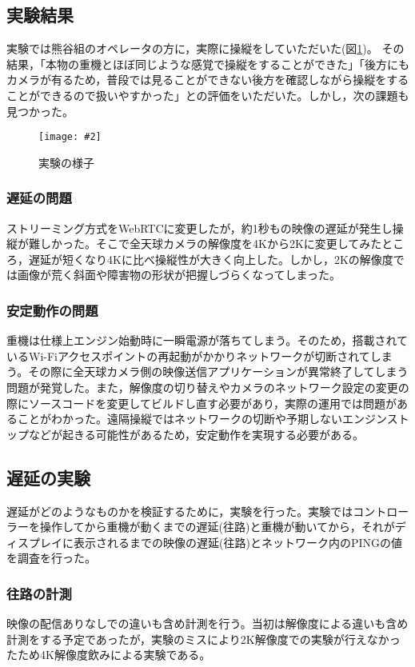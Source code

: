 \documentclass[a4paper,12pt]{jsarticle}
\newcommand{\figuref}[1]{図\ref{#1}}
\newcommand{\fig}[4][width=\textwidth]{
    \begin{figure}[!h]
    \begin{center}
    \texttt{[image: \#2]}
    \caption{#3}
    \label{#4}
    \vspace*{-1cm}
    \end{center}
    \end{figure}
}
\begin{document}
\subsection{実験結果}
実験では熊谷組のオペレータの方に，実際に操縦をしていただいた(\figuref{test})。 その結果，「本物の重機とほぼ同じような感覚で操縦をすることができた」「後方にもカメラが有るため，普段では見ることができない後方を確認しながら操縦をすることができるので扱いやすかった」との評価をいただいた。しかし，次の課題も見つかった。
\fig[width=7cm]{image/test.jpg}{実験の様子}{test}

\subsubsection{遅延の問題}
ストリーミング方式をWebRTCに変更したが，約1秒もの映像の遅延が発生し操縦が難しかった。そこで全天球カメラの解像度を4Kから2Kに変更してみたところ，遅延が短くなり4Kに比べ操縦性が大きく向上した。しかし，2Kの解像度では画像が荒く斜面や障害物の形状が把握しづらくなってしまった。

\subsubsection{安定動作の問題}
重機は仕様上エンジン始動時に一瞬電源が落ちてしまう。そのため，搭載されているWi-Fiアクセスポイントの再起動がかかりネットワークが切断されてしまう。その際に全天球カメラ側の映像送信アプリケーションが異常終了してしまう問題が発覚した。また，解像度の切り替えやカメラのネットワーク設定の変更の際にソースコードを変更してビルドし直す必要があり，実際の運用では問題があることがわかった。遠隔操縦ではネットワークの切断や予期しないエンジンストップなどが起きる可能性があるため，安定動作を実現する必要がある。

\subsection{遅延の実験}
遅延がどのようなものかを検証するために，実験を行った。実験ではコントローラーを操作してから重機が動くまでの遅延(往路)と重機が動いてから，それがディスプレイに表示されるまでの映像の遅延(往路)とネットワーク内のPINGの値を調査を行った。

\subsubsection{往路の計測}
映像の配信ありなしでの違いも含め計測を行う。当初は解像度による違いも含め計測をする予定であったが，実験のミスにより2K解像度での実験が行えなかったため4K解像度飲みによる実験である。
\end{document}
